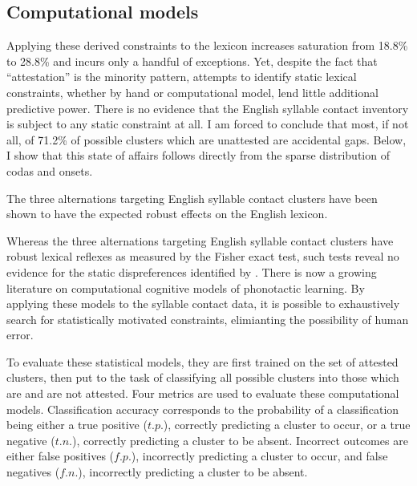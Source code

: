 \subsection{Computational models}


Applying these derived constraints to the lexicon increases saturation from 18.8\% to 28.8\% and incurs only a handful of exceptions. Yet, despite the fact that ``attestation'' is the minority pattern, attempts to identify static lexical constraints, whether by hand or computational model, lend little additional predictive power. There is no evidence that the English syllable contact inventory is subject to any static constraint at all. I am forced to conclude that most, if not all, of 71.2\% of possible clusters which are unattested are accidental gaps. Below, I show that this state of affairs follows directly from the sparse distribution of codas and onsets. 

The three alternations targeting English syllable contact clusters have been shown to have the expected robust effects on the English lexicon. 


Whereas the three alternations targeting English syllable contact clusters have robust lexical reflexes as measured by the Fisher exact test, such tests reveal no evidence for the static dispreferences identified by \citeauthor{Pierrehumbert1994}. There is now a growing literature on computational cognitive models of phonotactic learning. By applying these models to the syllable contact data, it is possible to exhaustively search for statistically motivated constraints, elimianting the possibility of human error. 

To evaluate these statistical models, they are first trained on the set of attested clusters, then put to the task of classifying all possible clusters into those which are and are not attested. Four metrics are used to evaluate these computational models. Classification accuracy corresponds to the probability of a classification being either a true positive ($t.p.$), correctly predicting a cluster to occur, or a true negative ($t.n.$), correctly predicting a cluster to be absent. Incorrect outcomes are either false positives ($f.p.$), incorrectly predicting a cluster to occur, and false negatives ($f.n.$), incorrectly predicting a cluster to be absent. 


